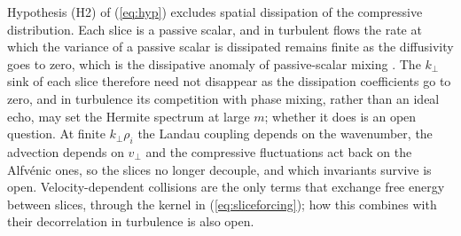 Hypothesis (H2) of (\ref{eq:hyp}) excludes spatial dissipation of the compressive distribution. Each slice is a passive scalar, and in turbulent flows the rate at which the variance of a passive scalar is dissipated remains finite as the diffusivity goes to zero, which is the dissipative anomaly of passive-scalar mixing \citep{ShraimanSiggia2000,FalkovichGawedzkiVergassola2001}. The $k_\perp$ sink of each slice therefore need not disappear as the dissipation coefficients go to zero, and in turbulence its competition with phase mixing, rather than an ideal echo, may set the Hermite spectrum at large $m$; whether it does is an open question. At finite $k_\perp\rho_i$ the Landau coupling depends on the wavenumber, the advection depends on $v_\perp$ and the compressive fluctuations act back on the Alfv\'enic ones, so the slices no longer decouple, and which invariants survive is open. Velocity-dependent collisions are the only terms that exchange free energy between slices, through the kernel in (\ref{eq:sliceforcing}); how this combines with their decorrelation in turbulence is also open.

